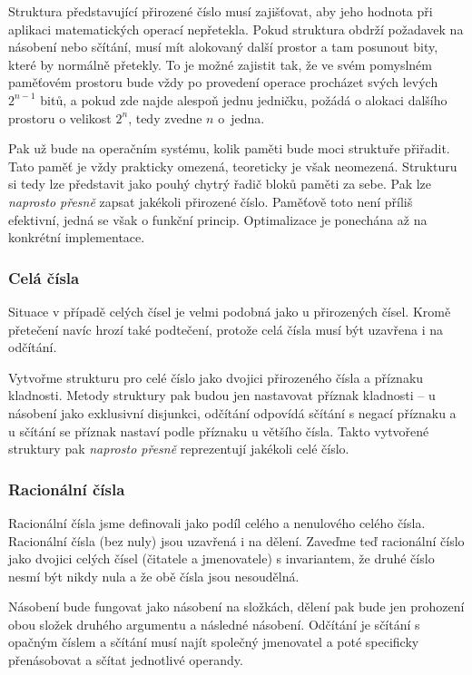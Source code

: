 Struktura představující přirozené číslo musí zajišťovat, aby jeho hodnota při aplikaci matematických operací nepřetekla. Pokud struktura obdrží požadavek na násobení nebo sčítání, musí mít alokovaný další prostor a tam posunout bity, které by normálně přetekly. To je možné zajistit tak, že ve svém pomyslném paměťovém prostoru bude vždy po provedení operace procházet svých levých $2^{n-1}$ bitů, a pokud zde najde alespoň jednu jedničku, požádá o alokaci dalšího prostoru o velikost $2^n$, tedy zvedne $n$ o~jedna.

Pak už bude na operačním systému, kolik paměti bude moci struktuře přiřadit. Tato paměť je vždy prakticky omezená, teoreticky je však neomezená. Strukturu si tedy lze představit jako pouhý chytrý řadič bloků paměti za sebe. Pak lze \textit{naprosto přesně} zapsat jakékoli přirozené číslo. Paměťově toto není příliš efektivní, jedná se však o funkční princip. Optimalizace je ponechána až na konkrétní implementace.

\subsubsection{Celá čísla}
Situace v případě celých čísel je velmi podobná jako u přirozených čísel. Kromě přetečení navíc hrozí také podtečení, protože celá čísla musí být uzavřena i na odčítání. 

Vytvořme strukturu pro celé číslo jako dvojici přirozeného čísla a příznaku kladnosti. Metody struktury pak budou jen nastavovat příznak kladnosti -- u násobení jako exklusivní disjunkci, odčítání odpovídá sčítání s negací příznaku a u sčítání se příznak nastaví podle příznaku u většího čísla. Takto vytvořené struktury pak \textit{naprosto přesně} reprezentují jakékoli celé číslo.

\subsubsection{Racionální čísla}
Racionální čísla jsme definovali jako podíl celého a nenulového celého čísla. Racionální čísla (bez nuly) jsou uzavřená i na dělení. Zaveďme teď racionální číslo jako dvojici celých čísel (čitatele a jmenovatele) s invariantem, že druhé číslo nesmí být nikdy nula a že obě čísla jsou nesoudělná.

Násobení bude fungovat jako násobení na složkách, dělení pak bude jen prohození obou složek druhého argumentu a následné násobení. Odčítání je sčítání s opačným číslem a sčítání musí najít společný jmenovatel a poté specificky přenásobovat a sčítat jednotlivé operandy.

